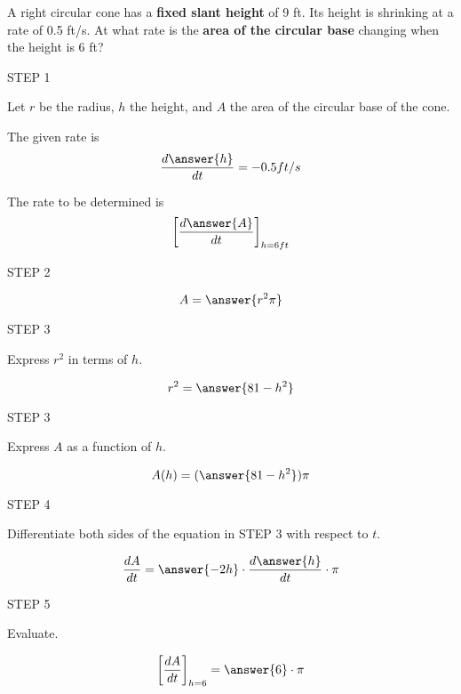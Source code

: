 \documentclass{ximera}
\author{Nela Lakos}
\begin{document}
\begin{exercise}

A right circular cone has a \textbf{fixed slant height} of  9 ft.  Its height is shrinking
at a rate of 0.5 ft/s. At what rate is the \textbf{area of the circular base} changing
when the height is 6 ft?


STEP 1 

 Let  $r$ be the radius, $h$ the height, and $A$ the area of the circular base of the cone.

The given rate is
\[
 \frac{d\answer{h}}{dt}=-0.5 ft/s
\]

The rate to be determined is
\[
\left[ \frac{d\answer{A}}{dt}\right]_{h=6ft}
\]


\begin{hint}
\begin{image}
\end{image}
\end{hint}



STEP 2

 \[
 A=\answer{r^{2}\pi}
 \]
 
 STEP 3
 
 Express $r^2$ in terms of $h$.
 
  \[
 r^2=\answer{81-h^2}
 \]

STEP 3

Express $A$ as a function of $h$.

 \[
 A(h)=(\answer{81-h^2})\pi
 \]
 
 
 STEP 4
 
 Differentiate both sides of the equation  in STEP 3 with respect to $t$.
 
  \[
 \frac{dA}{dt}=\answer{-2 h}\cdot  \frac{d\answer{h}}{dt}\cdot\pi
 \]
 
 
 STEP 5
 
 Evaluate.
 
  \[
\left[ \frac{dA}{dt}\right]_{h=6}=\answer{6}\cdot\pi
 \]
 
\end{exercise}
\end{document}

